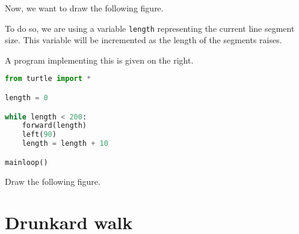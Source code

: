 \documentclass[12pt]{article}
\begin{document}
\begin{multicols}{2}
  Now, we want to draw the following figure.

\begin{center}
\end{center}

To do so, we are using a variable \texttt{length} representing the current line segment size. This variable will be incremented as the length of the segments raises.

A program implementing this is given on the right.

\columnbreak

\begin{lstlisting}[language=python,frame=single]
from turtle import *

length = 0

while length < 200:
    forward(length)
    left(90)
    length = length + 10

mainloop()
\end{lstlisting}

\end{multicols}

Draw the following figure.
\begin{center}
\end{center}

\section{Drunkard walk}
\end{document}

